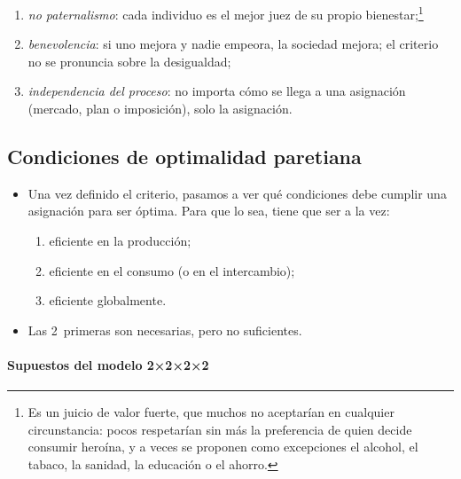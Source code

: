 \documentclass[11pt]{article}
\begin{document}
\begin{itemize}
\begin{enumerate}
  \item \emph{no paternalismo}: cada individuo es el mejor juez de su propio bienestar;\footnote{Es un juicio de valor fuerte, que muchos no aceptarían en cualquier circunstancia: pocos respetarían sin más la preferencia de quien decide consumir heroína, y a veces se proponen como excepciones el alcohol, el tabaco, la sanidad, la educación o el ahorro.}
  \item \emph{benevolencia}: si uno mejora y nadie empeora, la sociedad mejora; el criterio no se pronuncia sobre la desigualdad;
  \item \emph{independencia del proceso}: no importa cómo se llega a una asignación (mercado, plan o imposición), solo la asignación.
  \end{enumerate}
\end{itemize}

\subsection{Condiciones de optimalidad paretiana}\label{sec:condiciones-optimalidad}

\begin{itemize}
\item Una vez definido el criterio, pasamos a ver qué condiciones debe cumplir una asignación para ser óptima. Para que lo sea, tiene que ser a la vez:
  \begin{enumerate}
  \item eficiente en la producción;
  \item eficiente en el consumo (o en el intercambio);
  \item eficiente globalmente.
  \end{enumerate}
\item Las 2~primeras son necesarias, pero no suficientes.
\end{itemize}

\paragraph{Supuestos del modelo 2×2×2×2}
\end{document}
